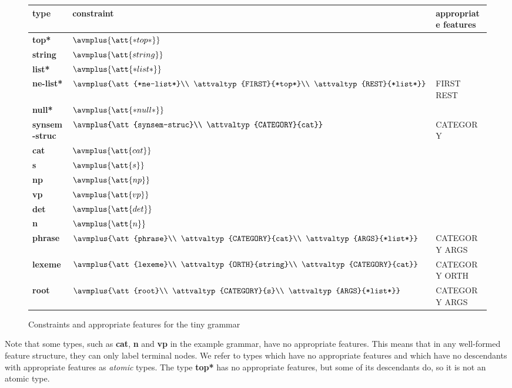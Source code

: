\documentclass[12pt]{report}
\begin{document}
\begin{figure}
\begin{center}
\begin{tabular}{lll}
type & constraint & appropriate features\\ \hline\hline
{\bf *top*} & {\tiny $\avmplus{\att{*top*}}$} & \\
{\bf string} & {\tiny $\avmplus{\att{string}}$} & \\
{\bf *list*} & {\tiny $\avmplus{\att{*list*}}$} & \\
{\bf *ne-list*} &
{\tiny $\avmplus{\att{*ne-list*}\\
\attvaltyp{FIRST}{*top*}\\
\attvaltyp{REST}{*list*}}$}
& FIRST REST\\
{\bf *null*}  & {\tiny $\avmplus{\att{*null*}}$}& \\
{\bf synsem-struc} & 
{\tiny $\avmplus{\att{synsem-struc}\\
\attvaltyp{CATEGORY}{cat}}$} 
& CATEGORY \\
{\bf cat} & {\tiny $\avmplus{\att{cat}}$} & \\
{\bf s} & {\tiny $\avmplus{\att{s}}$}& \\
{\bf np} & {\tiny $\avmplus{\att{np}}$}& \\
{\bf vp} & {\tiny $\avmplus{\att{vp}}$} & \\
{\bf det} & {\tiny $\avmplus{\att{det}}$} & \\
{\bf n} & {\tiny $\avmplus{\att{n}}$} & \\
{\bf phrase} &
{\tiny $\avmplus{\att{phrase}\\
\attvaltyp{CATEGORY}{cat}\\
\attvaltyp{ARGS}{*list*}}$} 
 & CATEGORY ARGS\\
{\bf lexeme} &
{\tiny $\avmplus{\att{lexeme}\\
\attvaltyp{ORTH}{string}\\
\attvaltyp{CATEGORY}{cat}}$} 
& CATEGORY ORTH \\
{\bf root} & 
{\tiny $\avmplus{\att{root}\\
\attvaltyp{CATEGORY}{s}\\
\attvaltyp{ARGS}{*list*}}$}
 & CATEGORY ARGS
\end{tabular}
\end{center}
\caption{Constraints and appropriate features
for the tiny grammar}
\label{fullcons}
\end{figure}
%

Note that some types, such as {\bf cat}, {\bf n} and {\bf vp}
in the example grammar, have no appropriate features.  This means
that in any well-formed feature structure, they can only
label terminal nodes.  We refer to types which
have no appropriate features and which have no descendants with
appropriate features as {\it atomic} types.
The type {\bf *top*} has no appropriate features, 
but some of its descendants do, so it is not an atomic type.
\end{document}
